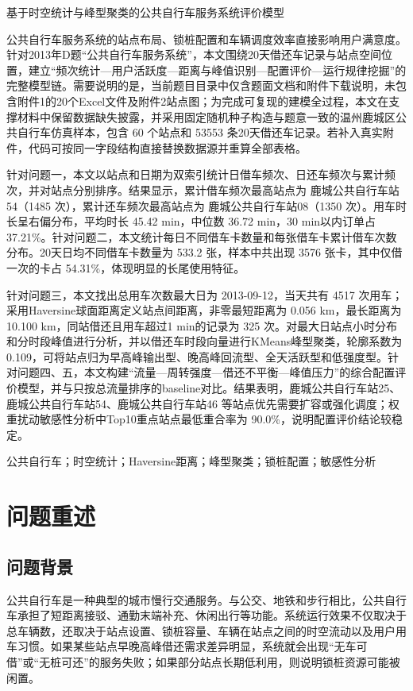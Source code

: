 \documentclass[UTF8,a4paper,12pt]{ctexart}
\begin{document}
\begin{center}
{\heiti 基于时空统计与峰型聚类的公共自行车服务系统评价模型}\\[0.8em]
\end{center}

公共自行车服务系统的站点布局、锁桩配置和车辆调度效率直接影响用户满意度。针对2013年D题“公共自行车服务系统”，本文围绕20天借还车记录与站点空间位置，建立“频次统计—用户活跃度—距离与峰值识别—配置评价—运行规律挖掘”的完整模型链。需要说明的是，当前题目目录中仅含题面文档和附件下载说明，未包含附件1的20个Excel文件及附件2站点图；为完成可复现的建模全过程，本文在支撑材料中保留数据缺失披露，并采用固定随机种子构造与题意一致的温州鹿城区公共自行车仿真样本，包含 60 个站点和 53553 条20天借还车记录。若补入真实附件，代码可按同一字段结构直接替换数据源并重算全部表格。

针对问题一，本文以站点和日期为双索引统计日借车频次、日还车频次与累计频次，并对站点分别排序。结果显示，累计借车频次最高站点为 鹿城公共自行车站54（1485 次），累计还车频次最高站点为 鹿城公共自行车站08（1350 次）。用车时长呈右偏分布，平均时长 45.42 min，中位数 36.72 min，30 min以内订单占 37.21\%。针对问题二，本文统计每日不同借车卡数量和每张借车卡累计借车次数分布。20天日均不同借车卡数量为 533.2 张，样本中共出现 3576 张卡，其中仅借一次的卡占 54.31\%，体现明显的长尾使用特征。

针对问题三，本文找出总用车次数最大日为 2013-09-12，当天共有 4517 次用车；采用Haversine球面距离定义站点间距离，非零最短距离为 0.056 km，最长距离为 10.100 km，同站借还且用车超过1 min的记录为 325 次。对最大日站点小时分布和分时段峰值进行分析，并以借还车时段向量进行KMeans峰型聚类，轮廓系数为 0.109，可将站点归为早高峰输出型、晚高峰回流型、全天活跃型和低强度型。针对问题四、五，本文构建“流量—周转强度—借还不平衡—峰值压力”的综合配置评价模型，并与只按总流量排序的baseline对比。结果表明，鹿城公共自行车站25、鹿城公共自行车站54、鹿城公共自行车站46 等站点优先需要扩容或强化调度；权重扰动敏感性分析中Top10重点站点最低重合率为 90.0\%，说明配置评价结论较稳定。

 公共自行车；时空统计；Haversine距离；峰型聚类；锁桩配置；敏感性分析
\newpage
\tableofcontents
\newpage

\section{问题重述}
\subsection{问题背景}
公共自行车是一种典型的城市慢行交通服务。与公交、地铁和步行相比，公共自行车承担了短距离接驳、通勤末端补充、休闲出行等功能。系统运行效果不仅取决于总车辆数，还取决于站点设置、锁桩容量、车辆在站点之间的时空流动以及用户用车习惯。如果某些站点早晚高峰借还需求差异明显，系统就会出现“无车可借”或“无桩可还”的服务失败；如果部分站点长期低利用，则说明锁桩资源可能被闲置。
\end{document}
